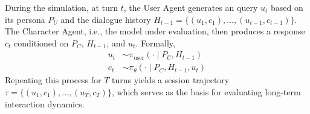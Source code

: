 

During the simulation, at turn $t$, the User Agent generates an query $u_t$ based on its persona $P_U$ and the dialogue history $H_{t-1} = \{(u_1, c_1), \dots, (u_{t-1}, c_{t-1})\}$. The Character Agent, i.e., the model under evaluation, then produces a response $c_t$ conditioned on $P_C$, $H_{t-1}$, and $u_t$. Formally,
\begin{equation}
\begin{split}
    u_t &\sim \pi_{\text{user}}(\cdot \mid P_U, H_{t-1}) \\
    c_t &\sim \pi_{\theta}(\cdot \mid P_C, H_{t-1}, u_t)
\end{split}
\end{equation}
Repeating this process for $T$ turns yields a session trajectory $\tau = \{(u_1, c_1), \dots, (u_T, c_T)\}$, which serves as the basis for evaluating long-term interaction dynamics.



